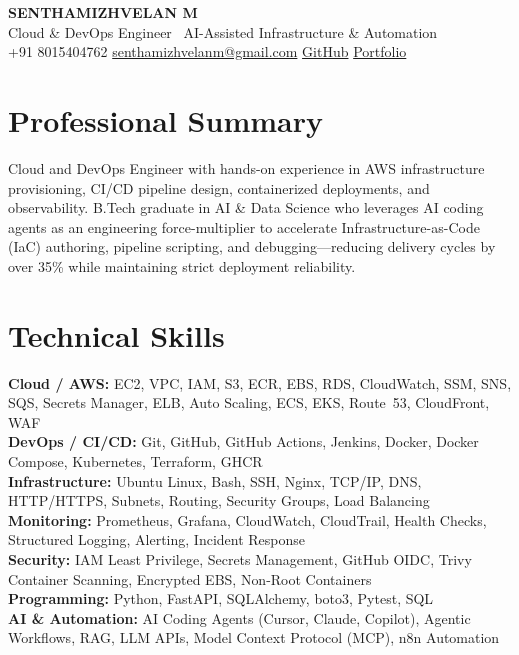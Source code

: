 \documentclass[a4paper,10pt]{article}
\begin{document}
\begin{center}
  {\Large\bfseries SENTHAMIZHVELAN M}\\[1.5pt]
  {\small Cloud \& DevOps Engineer \textbar\ AI-Assisted Infrastructure \& Automation}\\[1.5pt]
  {\small
    +91 8015404762 \enspace\textbar\enspace
    \href{mailto:senthamizhvelanm@gmail.com}{senthamizhvelanm@gmail.com} \enspace\textbar\enspace
    \href{https://github.com/senthamizhvelan04}{GitHub} \enspace\textbar\enspace
    \href{https://senthamizhvelan04.github.io/portfolio/}{Portfolio}
  }
\end{center}

\section{Professional Summary}
{\small Cloud and DevOps Engineer with hands-on experience in AWS infrastructure provisioning, CI/CD pipeline design, containerized deployments, and observability. B.Tech graduate in AI \& Data Science who leverages AI coding agents as an engineering force-multiplier to accelerate Infrastructure-as-Code (IaC) authoring, pipeline scripting, and debugging---reducing delivery cycles by over 35\% while maintaining strict deployment reliability.}

\section{Technical Skills}
{\small
\textbf{Cloud / AWS:} EC2, VPC, IAM, S3, ECR, EBS, RDS, CloudWatch, SSM, SNS, SQS, Secrets Manager, ELB, Auto Scaling, ECS, EKS, Route~53, CloudFront, WAF\\[1.5pt]
\textbf{DevOps / CI/CD:} Git, GitHub, GitHub Actions, Jenkins, Docker, Docker Compose, Kubernetes, Terraform, GHCR\\[1.5pt]
\textbf{Infrastructure:} Ubuntu Linux, Bash, SSH, Nginx, TCP/IP, DNS, HTTP/HTTPS, Subnets, Routing, Security Groups, Load Balancing\\[1.5pt]
\textbf{Monitoring:} Prometheus, Grafana, CloudWatch, CloudTrail, Health Checks, Structured Logging, Alerting, Incident Response\\[1.5pt]
\textbf{Security:} IAM Least Privilege, Secrets Management, GitHub OIDC, Trivy Container Scanning, Encrypted EBS, Non-Root Containers\\[1.5pt]
\textbf{Programming:} Python, FastAPI, SQLAlchemy, boto3, Pytest, SQL\\[1.5pt]
\textbf{AI \& Automation:} AI Coding Agents (Cursor, Claude, Copilot), Agentic Workflows, RAG, LLM APIs, Model Context Protocol (MCP), n8n Automation
}
\end{document}
